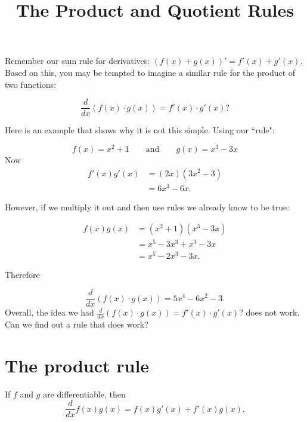 \documentclass{ximera}
\title{The Product and Quotient Rules}
\begin{document}
\begin{abstract}
\end{abstract}
\maketitle

Remember our sum rule for derivatives: $(f(x)+g(x))'=f'(x)+g'(x)$. Based on this, you may be tempted to imagine a similar rule for the product of two functions:

  \[
  \frac{d}{dx} \left(f(x)\cdot g(x)\right) = f'(x) \cdot g'(x)?
  \]

Here is an example that shows why it is not this simple. Using our ``rule":

  \[
  f(x) = x^2+1\qquad\text{and}\qquad g(x) = x^3-3x
  \]
  Now
  \begin{align*}
    f'(x)g'(x) &= (2x)(3x^2-3)\\
    &= 6x^3-6x.
  \end{align*}

However, if we multiply it out and then use rules we already know to be true:

  \begin{align*}
    f(x)g(x) &= (x^2+1)(x^3-3x)\\
    &=x^5-3x^3+x^3-3x\\
    &=x^5-2x^3-3x.
  \end{align*} 

Therefore

  \[
  \frac{d}{dx} \left(f(x) \cdot g(x)\right) = 5x^4-6x^2-3.
  \]
Overall, the idea we had $  \frac{d}{dx} \left(f(x)\cdot g(x)\right) = f'(x) \cdot g'(x)?$ does not work. Can we find out a rule that does work?

\section{The product rule}

\begin{theorem}\label{theorem:product-rule}
If $f$ and $g$ are differentiable, then
\[
\frac{d}{dx} f(x)g(x) = f(x)g'(x)+f'(x)g(x).
\]
\end{theorem}

\end{document}
